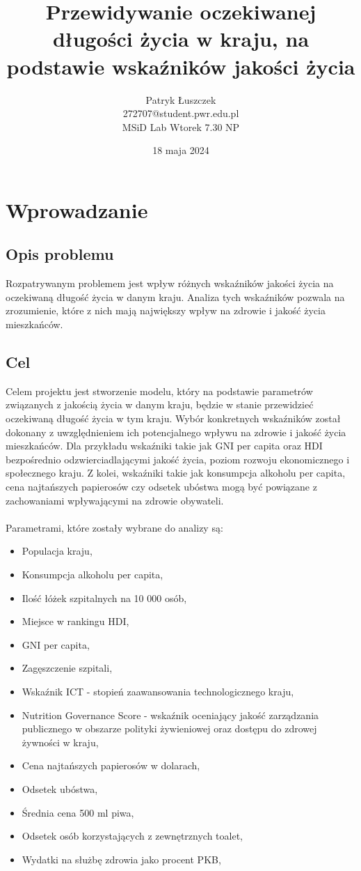 \documentclass{article}
\title{Przewidywanie oczekiwanej długości życia w kraju, na podstawie wskaźników jakości życia}
\author{Patryk Łuszczek \\ 272707@student.pwr.edu.pl \\ MSiD Lab Wtorek 7.30 NP}
\date{18 maja 2024}
\begin{document}
\maketitle
\pagebreak

\tableofcontents
\pagebreak

\section{Wprowadzanie}
\subsection{Opis problemu}
Rozpatrywanym problemem jest wpływ różnych wskaźników jakości życia na oczekiwaną długość życia w danym kraju.
Analiza tych wskaźników pozwala na zrozumienie, które z nich mają największy wpływ na zdrowie i jakość życia mieszkańców.
\subsection{Cel}
Celem projektu jest stworzenie modelu, który na podstawie parametrów związanych z jakością życia w danym kraju, będzie w stanie przewidzieć oczekiwaną długość życia w tym kraju.
Wybór konkretnych wskaźników został dokonany z uwzględnieniem ich potencjalnego wpływu na zdrowie i jakość życia mieszkańców.
Dla przykładu wskaźniki takie jak GNI per capita oraz HDI bezpośrednio odzwierciadlającymi jakość życia, poziom rozwoju ekonomicznego
i społecznego kraju. Z kolei, wskaźniki takie jak konsumpcja alkoholu per capita, cena najtańszych papierosów czy odsetek ubóstwa
mogą być powiązane z zachowaniami wpływającymi na zdrowie obywateli. \\ \\
Parametrami, które zostały wybrane do analizy są:
\begin{itemize}
    \item Populacja kraju,
    \item Konsumpcja alkoholu per capita,
    \item Ilość łóżek szpitalnych na 10 000 osób,
    \item Miejsce w rankingu HDI,
    \item GNI per capita,
    \item Zagęszczenie szpitali,
    \item Wskaźnik ICT - stopień zaawansowania technologicznego kraju,
    \item Nutrition Governance Score - wskaźnik oceniający jakość zarządzania publicznego w obszarze polityki żywieniowej oraz dostępu do zdrowej żywności w kraju,
    \item Cena najtańszych papierosów w dolarach,
    \item Odsetek ubóstwa,
    \item Średnia cena 500 ml piwa,
    \item Odsetek osób korzystających z zewnętrznych toalet,
    \item Wydatki na służbę zdrowia jako procent PKB,
\end{itemize}
\end{document}
